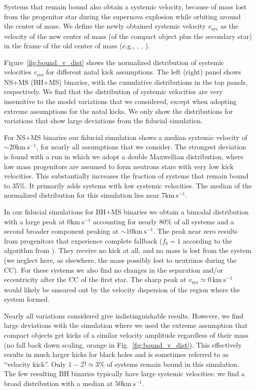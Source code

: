 \documentclass{aa}
\newcommand{\kms}{{\mathrm{km\ s^{-1}}}}
\DeclareRobustCommand{\Figref}[1]{Fig.~\ref{#1}}
\begin{document}
Systems that remain bound also obtain a systemic velocity, because of
mass lost from the progenitor star during the supernova explosion
while orbiting around the center of mass.  We define the newly
obtained systemic velocity $v_\mathrm{sys}$ as the velocity of the new
center of mass (of the compact object plus the secondary star) in the
frame of the old center of mass (e.g.,
\citealt{brandt:95}, \citealt{kalogera:96}, ).  

Figure~\ref{fig:bound_v_dist} shows the normalized distribution of
systemic velocities $v_\mathrm{sys}$ for different natal kick
assumptions. The left (right) panel shows NS+MS (BH+MS) binaries, with
the cumulative distributions in the top panels, respectively.  We find that the distribution of systemic velocities are very insensitive to the model variations that we considered, except when adopting extreme assumptions for the natal kicks. We only show the distributions for variations that show large deviations from the fiducial simulation.   

For NS+MS binaries  our fiducial simulation shows a median systemic velocity of $\sim 20\kms$, for nearly all assumptions that we consider. The strongest deviation is found with a run in which we adopt a double Maxwellian distribution, where low mass progenitors are assumed to form neutrons stars with very low kick velocities.  This substantially increases the fraction of systems that remain bound to 35\%. It primarily adds systems with low systemic velocities. The median of the normalized distribution for this simulation lies near $7 \kms$.  

In our fiducial simulations for BH+MS binaries we obtain a bimodal
distribution with a large peak at $0 \kms$ accounting for nearly 80\%
of all systems and a second broader component peaking at $\sim
10\kms$.  The peak near zero results from progenitors that experience
complete fallback ($f_b=1$ according to the algorithm from
\citealt{fryer:12}). They receive no kick at all, and no mass is lost from
the system (we neglect here, as elsewhere, the mass possibly lost to
neutrinos during the CC). For these systems we also find no changes in
the separation and/or eccentricity after the CC of the first star.
The sharp peak at $v_\mathrm{sys}\simeq0\,\kms$ would likely be
smeared out by the velocity dispersion of the region where the system
formed.

Nearly all  variations considered give indistinguishable results. However, we find large deviations with the simulation where we used the extreme assumption that compact objects get kicks of a similar velocity amplitude regardless of their mass (no fall back down scaling, orange in \Figref{fig:bound_v_dist}). This effectively results in much larger kicks for black holes and is sometimes referred to as ``velocity kick''. Only $1-\mathcal{D}\simeq3\%$  of systems remain bound in this simulation.  The few resulting BH binaries typically have large systemic velocities: we find a broad distribution with a median at $50\kms$. 
\end{document}
